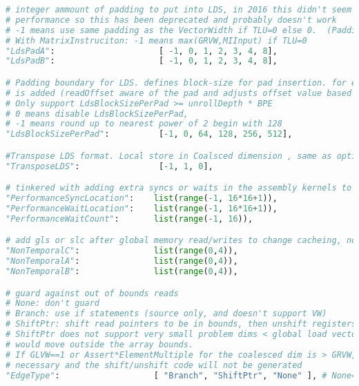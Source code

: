 \documentclass[]{article}
\begin{document}
\begin{lstlisting}[language=python,breaklines=true]
# integer ammount of padding to put into LDS, in 2016 this didn't seem to help performance, profilers were showing that channel conflicts weren't really hurting
# performance so this has been deprecated and probably doesn't work
# -1 means use same padding as the VectorWidth if TLU=0 else 0.  (Padding only helps when transpose is required)
# With MatrixInstruciton: -1 means max(GRVW,MIInput) if TLU=0
"LdsPadA":                     [ -1, 0, 1, 2, 3, 4, 8],
"LdsPadB":                     [ -1, 0, 1, 2, 3, 4, 8],

# Padding boundary for LDS. defines block-size for pad insertion. for every 'LdsBlockSizePerPad' bytes, LDS padding (pad value from LdsPad parameter)
# is added (readOffset aware of the pad and adjusts offset value based on this parameter value).
# Only support LdsBlockSizePerPad >= unrollDepth * BPE
# 0 means disable LdsBlockSizePerPad,
# -1 means round up to nearest power of 2 begin with 128
"LdsBlockSizePerPad":          [-1, 0, 64, 128, 256, 512],

#Transpose LDS format. Local store in Coalsced dimension , same as optimized global fetch dimension . applicable only in TLU=0 case for miSIMD(s)
"TransposeLDS":                [-1, 1, 0],

# tinkered with adding extra syncs or waits in the assembly kernels to see if it would improve the sequencing between workgroups, "fully synchronous scheduling" is WAY more promising; this can be deprecated
"PerformanceSyncLocation":    list(range(-1, 16*16+1)),
"PerformanceWaitLocation":    list(range(-1, 16*16+1)),
"PerformanceWaitCount":       list(range(-1, 16)),

# add gls or slc after global memory read/writes to change cacheing, not cacheing the writes is promising and improved performance a tiny bit
"NonTemporalC":               list(range(0,4)),
"NonTemporalA":               list(range(0,4)),
"NonTemporalB":               list(range(0,4)),

# guard against out of bounds reads
# None: don't guard
# Branch: use if statements (source only, and doesn't support VW)
# ShiftPtr: shift read pointers to be in bounds, then unshift registers (source & assembly),
# ShiftPtr does not support very small problem dims < global load vector width since the shift
# would move outside the array bounds.
# If GLVW==1 or Assert*ElementMultiple for the coalesced dim is > GRVW, then shifting is not
# necessary and the shift/unshift code will not be generated
"EdgeType":                   [ "Branch", "ShiftPtr", "None" ], # None=don't guard against ou


\end{lstlisting}
\end{document}
